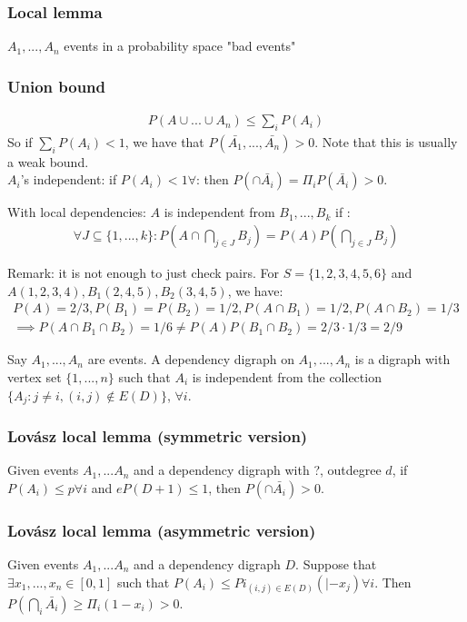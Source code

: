 \subsubsection{Local lemma}
$A_1, ..., A_n$ events in a probability space "bad events"
\subsubsection{Union bound}
\begin{eqnarray}
	P(A \cup ... \cup A_n) \leq \sum_i P(A_i)
\end{eqnarray}
So if $\sum_i P(A_i) < 1$, we have that $P(\bar{A_1}, ..., \bar{A_n}) > 0$. Note that this is usually a weak bound.\\

$A_i$'s independent: if $P(A_i) < 1 \forall$: then $P(\cap \bar{A_i}) = \Pi_i P(\bar{A_i}) > 0$.

With local dependencies: $A$ is independent from $B_1, ..., B_k$ if :
\begin{eqnarray}
	\forall J \subseteq \{1,...,k\} : P(A \cap \bigcap_{j \in J} B_j) = P(A) P(\bigcap_{j \in J}B_j)
\end{eqnarray}

Remark: it is not enough to just check pairs. For $S = \{1,2,3,4,5,6\}$ and $A(1,2,3,4), B_1(2,4,5), B_2(3,4,5)$, we have:
\begin{eqnarray}
	P(A) = 2/3, P(B_1) = P(B_2) = 1/2, P(A \cap B_1) = 1/2, P(A \cap B_2) = 1/3\\
	\implies P(A \cap B_1 \cap B_2) = 1/6 \neq P(A) P(B_1 \cap B_2) = 2/3 \cdot 1/3 = 2/9 
\end{eqnarray}

Say $A_1, ..., A_n$ are events. A dependency digraph on $A_1, ..., A_n$ is a digraph with vertex set $\{ 1, ..., n \}$ such that $A_i$ is independent from the collection $\{ A_j : j \neq i, (i,j) \notin E(D) \}$, $\forall i$.

\subsubsection{Lovász local lemma (symmetric version)}
Given events $A_1,...A_n$ and a dependency digraph with ?, outdegree $d$, if $P(A_i) \leq p \forall i$ and $eP(D+1) \leq 1$, then $P(\cap \bar{A_i}) > 0$.

\subsubsection{Lovász local lemma (asymmetric version)}
Given events $A_1,...A_n$ and a dependency digraph $D$.
Suppose that $\exists x_1, ..., x_n \in [0,1]$ such that $P(A_i) \leq Pi_{(i,j) \in E(D)}( |- x_j) \forall i$. Then $P(\bigcap_i \bar{A_i}) \geq \Pi_i (1 - x_i) > 0$.

